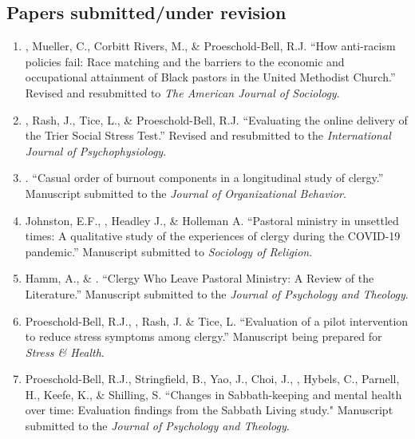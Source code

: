\subsection*{Papers submitted/under revision}
\begin{enumerate} 
\item \Eagle, Mueller, C.,  Corbitt Rivers, M., \& Proeschold-Bell, R.J. ``How anti-racism policies fail: Race matching and the barriers to the economic and occupational attainment of Black pastors in the United Methodist Church.'' Revised and resubmitted to \textit{The American Journal of Sociology}.

\item \Eagle, Rash, J., Tice, L., \& Proeschold-Bell, R.J. ``Evaluating the online delivery of the Trier Social Stress Test.'' Revised and resubmitted to the \textit{International Journal of Psychophysiology}.

\item \Eagle. ``Casual order of burnout components in a longitudinal study of clergy.'' Manuscript submitted to the \textit{Journal of Organizational Behavior}.

\item Johnston, E.F., \Eagle, Headley J., \& Holleman A. ``Pastoral ministry in unsettled times: A qualitative study of the experiences of clergy during the COVID-19 pandemic.'' Manuscript submitted to \textit{Sociology of Religion}.

\item Hamm, A., \&  \Eagle. ``Clergy Who Leave Pastoral Ministry: A Review of the Literature.'' Manuscript submitted to the \textit{Journal of Psychology and Theology}.

\item Proeschold-Bell, R.J., \Eagle, Rash, J. \& Tice, L. ``Evaluation of a pilot intervention to reduce stress symptoms among clergy.'' Manuscript being prepared for \textit{Stress \& Health}.

\item Proeschold-Bell, R.J., Stringfield, B., Yao, J., Choi, J., \Eagle, Hybels, C., Parnell, H., Keefe, K., \& Shilling, S. ``Changes in Sabbath-keeping and mental health over time: Evaluation findings from the Sabbath Living study." Manuscript submitted to the \textit{Journal of Psychology and Theology}.

\end{enumerate}
